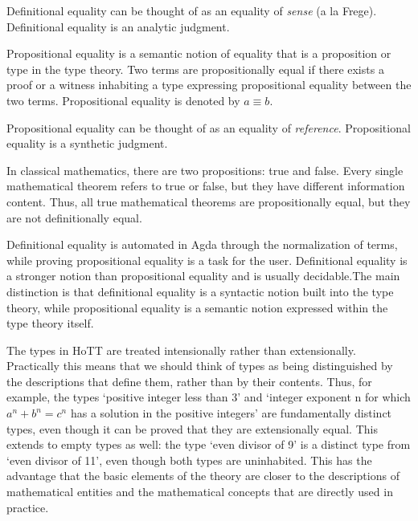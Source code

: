 \documentclass{article}
\begin{document}
\begin{remark}[?]
  Definitional equality can be thought of as an equality of \emph{sense} (a la Frege). Definitional equality is an analytic judgment.
\end{remark}

\begin{definition}
  Propositional equality is a semantic notion of equality that is a proposition or type in the type theory. Two terms are propositionally equal if there exists a proof or a witness inhabiting a type expressing propositional equality between the two terms. Propositional equality is denoted by $a \equiv b$.
\end{definition}

\begin{remark}[?]
  Propositional equality can be thought of as an equality of \emph{reference}. Propositional equality is a synthetic judgment.
\end{remark}

\begin{example}[?]
 In classical mathematics, there are two propositions: true and false. Every single mathematical theorem refers to true or false, but they have different information content. Thus, all true mathematical theorems are propositionally equal, but they are not definitionally equal.
\end{example}

\begin{remark}
  Definitional equality is automated in Agda through the normalization of terms, while proving propositional equality is a task for the user. Definitional equality is a stronger notion than propositional equality and is usually decidable.The main distinction is that definitional equality is a syntactic notion built into the type theory, while propositional equality is a semantic notion expressed within the type theory itself.
\end{remark}

\begin{remark}
  The types in HoTT are treated intensionally rather than extensionally. Practically this means that we should think of types as being distinguished by the descriptions that define them, rather than by their contents. Thus, for example, the types ‘positive integer less than 3’ and ‘integer exponent n for which $a^n + b^n = c^n$ has a solution in the positive integers’ are fundamentally distinct types, even though it can be proved that they are extensionally equal. This extends to empty types as well: the type ‘even divisor of 9’ is a distinct type from ‘even divisor of 11’, even though both types are uninhabited. This has the advantage that the basic elements of the theory are closer to the descriptions of mathematical entities and the mathematical concepts that are directly used in practice.
\end{remark}
\end{document}
